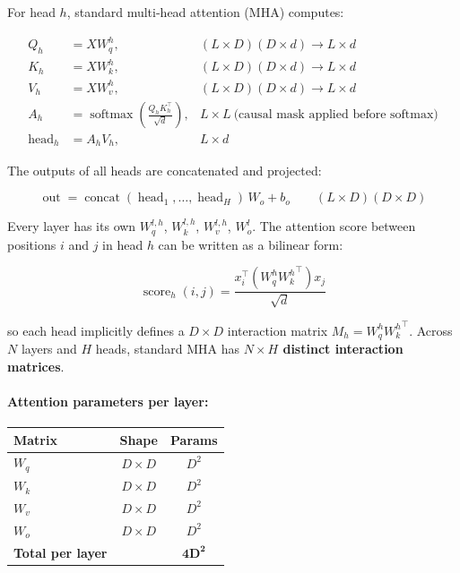 \documentclass[11pt]{article}
\begin{document}
For head $h$, standard multi-head attention (MHA) computes:

\begin{align*}
Q_h &= X W_q^h, & (L\times D)(D\times d) \rightarrow L\times d\\
K_h &= X W_k^h, & (L\times D)(D\times d) \rightarrow L\times d\\
V_h &= X W_v^h, & (L\times D)(D\times d) \rightarrow L\times d\\[6pt]
A_h &= \operatorname{softmax}\!\left(\frac{Q_h K_h^\top}{\sqrt{d}}\right), & L\times L \ \text{(causal mask applied before softmax)}\\[6pt]
\operatorname{head}_h &= A_h V_h, & L\times d
\end{align*}

The outputs of all heads are concatenated and projected:

\begin{equation*}
\operatorname{out} = \operatorname{concat}(\operatorname{head}_1, \ldots, \operatorname{head}_H)\, W_o + b_o \qquad (L\times D)(D\times D)
\end{equation*}

Every layer has its own $W_q^{l,h}$, $W_k^{l,h}$, $W_v^{l,h}$, $W_o^l$. The attention score between positions $i$ and $j$ in head $h$ can be written as a bilinear form:

\begin{equation*}
\operatorname{score}_h(i,j) = \frac{x_i^\top \left(W_q^h {W_k^h}^\top\right) x_j}{\sqrt{d}}
\end{equation*}

so each head implicitly defines a $D\times D$ interaction matrix $M_h = W_q^h {W_k^h}^\top$. Across $N$ layers and $H$ heads, standard MHA has \textbf{$N\times H$ distinct interaction matrices}.

\paragraph{Attention parameters per layer:}

\begin{center}
\begin{tabular}{lcc}
\toprule
Matrix & Shape & Params \\
\midrule
$W_q$ & $D\times D$ & $D^2$ \\
$W_k$ & $D\times D$ & $D^2$ \\
$W_v$ & $D\times D$ & $D^2$ \\
$W_o$ & $D\times D$ & $D^2$ \\
\midrule
\textbf{Total per layer} & & $\mathbf{4D^2}$ \\
\bottomrule
\end{tabular}
\end{center}
\end{document}
